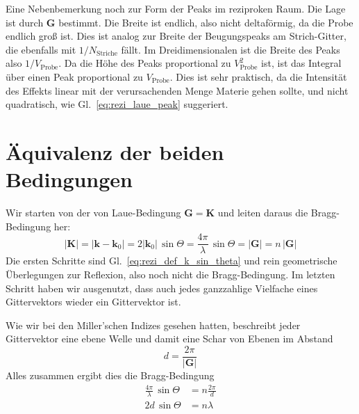 Eine Nebenbemerkung noch zur Form der Peaks im reziproken Raum. Die Lage ist durch $\mathbf{G}$ bestimmt. Die Breite ist endlich, also nicht deltaförmig, da die Probe endlich groß ist. Dies ist analog zur Breite der Beugungspeaks am Strich-Gitter, die ebenfalls mit $1/N_\text{Striche}$ fällt. Im Dreidimensionalen ist die Breite des Peaks also $1/V_\text{Probe}$. Da die Höhe des Peaks proportional zu $ V_\text{Probe}^2$ ist, ist das Integral über einen Peak proportional zu $ V_\text{Probe}$. Dies ist sehr praktisch, da die Intensität des Effekts linear mit der verursachenden Menge Materie gehen sollte, und nicht quadratisch, wie Gl.~\ref{eq:rezi_laue_peak} suggeriert.


\section{Äquivalenz der beiden Bedingungen}

Wir starten von der von Laue-Bedingung $\mathbf{G} =  \mathbf{K}$ und leiten daraus die Bragg-Bedingung her:
\begin{equation}
 | \mathbf{K} | =  |\mathbf{k} - \mathbf{k}_0| = 2 | \mathbf{k}_0| \, \sin \Theta = \frac{4 \pi}{ \lambda} \, \sin \Theta = | \mathbf{G} | = n \, | \mathbf{G} | 
\end{equation}
Die ersten Schritte sind Gl.~\ref{eq:rezi_def_k_sin_theta} und rein geometrische Überlegungen zur Reflexion, also noch nicht die Bragg-Bedingung. Im letzten Schritt haben wir ausgenutzt, dass auch jedes ganzzahlige Vielfache eines Gittervektors wieder ein Gittervektor ist.

Wie wir bei den Miller'schen Indizes gesehen hatten, beschreibt jeder Gittervektor eine ebene Welle und damit eine Schar von Ebenen im Abstand 
\begin{equation}
 d = \frac{2 \pi}{|\mathbf{G} | }
\end{equation}
 Alles zusammen ergibt dies die Bragg-Bedingung
 \begin{align}
   \frac{4 \pi}{ \lambda} \, \sin \Theta  & = n \frac{2 \pi}{d } \\
   2 d  \, \sin \Theta  & = n \lambda 
 \end{align}
 

